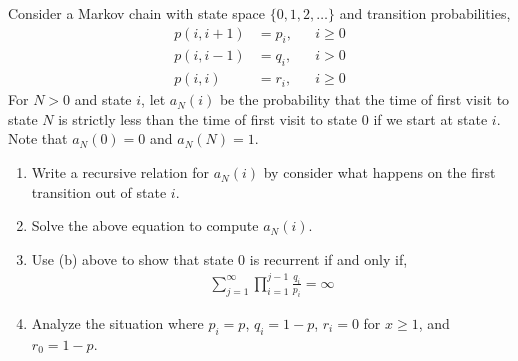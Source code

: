 \begin{problem}
    Consider a Markov chain with state space \( \{0,1,2,\ldots\} \) and transition probabilities,
    \begin{align*}
        p(i,i+1) &= p_i, && i\geq 0 \\
        p(i,i-1) &= q_i, && i> 0 \\
        p(i,i) &= r_i, && i\geq 0
    \end{align*}
    For \( N > 0 \) and state \( i \), let \( a_N(i) \) be the probability that the time of first visit to state \( N \) is strictly less than the time of first visit to state \( 0 \) if we start at state \( i \). Note that \( a_N(0) = 0 \) and \( a_N(N) = 1 \).
\begin{enumerate}[nolistsep,label=(\alph*)]
    \item Write a recursive relation for \( a_N(i) \) by consider what happens on the first transition out of state \( i \).
    \item Solve the above equation to compute \( a_N(i) \).
    \item Use (b) above to show that state 0 is recurrent if and only if,
        \begin{align*}
            \sum_{j=1}^{\infty} \prod_{i=1}^{j-1} \frac{q_i}{p_i} = \infty
        \end{align*}
    \item Analyze the situation where \( p_i = p \), \( q_i = 1-p \), \( r_i = 0 \) for \( x \geq 1 \), and \( r_0 = 1-p \).
\end{enumerate}

\end{problem}

